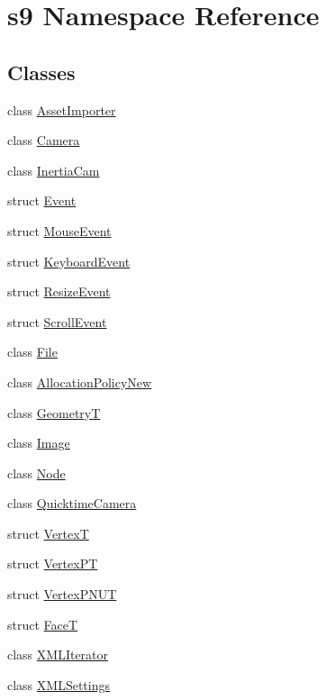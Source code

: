 \hypertarget{namespaces9}{\section{s9 \-Namespace \-Reference}
\label{namespaces9}
}
\subsection*{\-Classes}
\begin{DoxyCompactItemize}
\item 
class \hyperlink{classs9_1_1AssetImporter}{\-Asset\-Importer}
\item 
class \hyperlink{classs9_1_1Camera}{\-Camera}
\item 
class \hyperlink{classs9_1_1InertiaCam}{\-Inertia\-Cam}
\item 
struct \hyperlink{structs9_1_1Event}{\-Event}
\item 
struct \hyperlink{structs9_1_1MouseEvent}{\-Mouse\-Event}
\item 
struct \hyperlink{structs9_1_1KeyboardEvent}{\-Keyboard\-Event}
\item 
struct \hyperlink{structs9_1_1ResizeEvent}{\-Resize\-Event}
\item 
struct \hyperlink{structs9_1_1ScrollEvent}{\-Scroll\-Event}
\item 
class \hyperlink{classs9_1_1File}{\-File}
\item 
class \hyperlink{classs9_1_1AllocationPolicyNew}{\-Allocation\-Policy\-New}
\item 
class \hyperlink{classs9_1_1GeometryT}{\-Geometry\-T}
\item 
class \hyperlink{classs9_1_1Image}{\-Image}
\item 
class \hyperlink{classs9_1_1Node}{\-Node}
\item 
class \hyperlink{classs9_1_1QuicktimeCamera}{\-Quicktime\-Camera}
\item 
struct \hyperlink{structs9_1_1VertexT}{\-Vertex\-T}
\item 
struct \hyperlink{structs9_1_1VertexPT}{\-Vertex\-P\-T}
\item 
struct \hyperlink{structs9_1_1VertexPNUT}{\-Vertex\-P\-N\-U\-T}
\item 
struct \hyperlink{structs9_1_1FaceT}{\-Face\-T}
\item 
class \hyperlink{classs9_1_1XMLIterator}{\-X\-M\-L\-Iterator}
\item 
class \hyperlink{classs9_1_1XMLSettings}{\-X\-M\-L\-Settings}
\item 

\end{DoxyCompactItemize}
